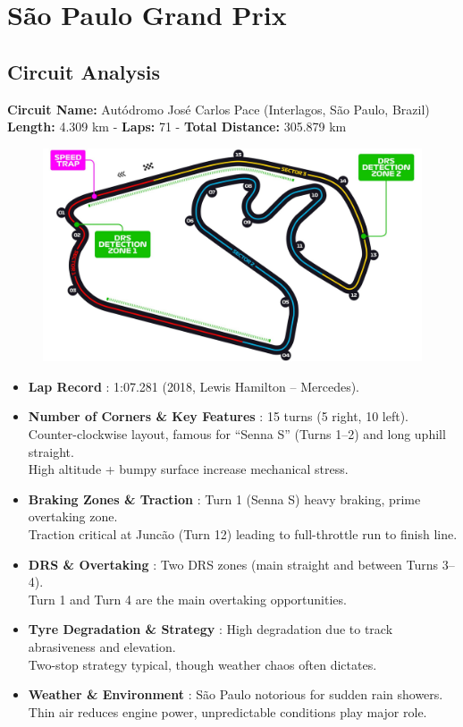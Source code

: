 \section{São Paulo Grand Prix}

\subsection{Circuit Analysis}

\textbf{Circuit Name:} Autódromo José Carlos Pace (Interlagos, São Paulo, Brazil) \\
\textbf{Length:} 4.309 km - \textbf{Laps:} 71 - \textbf{Total Distance:} 305.879 km

\begin{figure}[H]
    \centering
    \includegraphics[width=0.75\linewidth]{images/21.Brazil_Circuit.jpg}
\end{figure}

\begin{itemize}
    \item \textbf{Lap Record} : 1:07.281 (2018, Lewis Hamilton – Mercedes).
    
    \item \textbf{Number of Corners \& Key Features} : 15 turns (5 right, 10 left). \\
    Counter-clockwise layout, famous for “Senna S” (Turns 1–2) and long uphill straight. \\
    High altitude + bumpy surface increase mechanical stress.
    
    \item \textbf{Braking Zones \& Traction} : Turn 1 (Senna S) heavy braking, prime overtaking zone. \\
    Traction critical at Juncão (Turn 12) leading to full-throttle run to finish line.
    
    \item \textbf{DRS \& Overtaking} : Two DRS zones (main straight and between Turns 3–4). \\
    Turn 1 and Turn 4 are the main overtaking opportunities.
    
    \item \textbf{Tyre Degradation \& Strategy} : High degradation due to track abrasiveness and elevation. \\
    Two-stop strategy typical, though weather chaos often dictates.
    
    \item \textbf{Weather \& Environment} : São Paulo notorious for sudden rain showers. \\
    Thin air reduces engine power, unpredictable conditions play major role.
\end{itemize}

